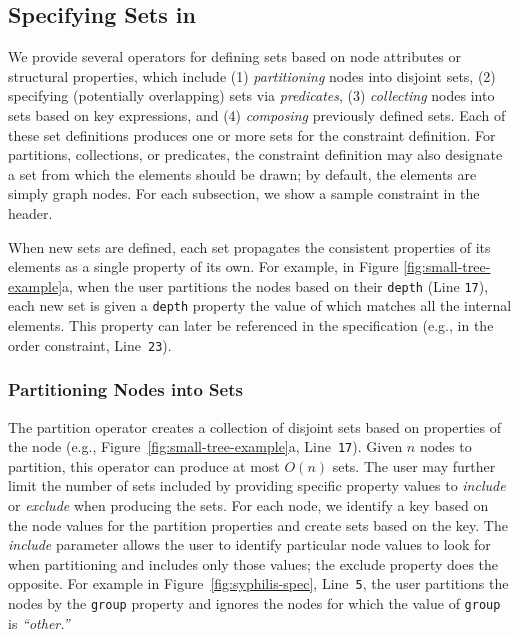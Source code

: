 \smallTreeExampleWebCoLa

\vspace{-10px}
\subsection{Specifying Sets in \projectname}
We provide several operators for defining sets based on node attributes 
or structural properties, which include (1) \emph{partitioning} nodes 
into disjoint sets, (2) specifying (potentially overlapping) sets via
\emph{predicates}, (3) \emph{collecting} nodes into sets based on key expressions,
and (4) \emph{composing} previously defined sets. Each of these set
definitions produces one or more sets for the constraint definition. For
partitions, collections, or predicates, the constraint definition may also 
designate a set from which the elements should be drawn; by default, the
elements are simply graph nodes. For each subsection, we show a sample
\projectname constraint in the header.

When new sets are defined, each set propagates the consistent properties
of its elements as a single property of its own. For example, in
Figure \ref{fig:small-tree-example}a, when the user
partitions the nodes based on their \texttt{depth} (Line
\texttt{17}), each new set is given a \texttt{depth} property the value of which 
matches all the internal elements. This property can later be referenced 
in the \projectname specification (e.g., in the order constraint, Line~\texttt{23}).

\subsubsection{Partitioning Nodes into Sets}
The partition operator creates a collection of disjoint sets based on
properties of the node
(e.g., Figure~\ref{fig:small-tree-example}a, Line~\texttt{17}).
Given $n$ nodes to partition, this operator can produce at most $O(n)$ 
sets. The user may further limit 
the number of sets included by providing specific property values to 
\emph{include} or \emph{exclude} when producing the sets.
For each node, we identify a key based on the node values for the partition
properties and create sets based on the key. The \emph{include} parameter allows
the user to identify particular node values to look for when partitioning
and includes only those values; the exclude property does the opposite. 
For example in Figure~\ref{fig:syphilis-spec}, Line~\texttt{5}, the user
partitions the nodes by the \texttt{group} property and ignores the nodes
for which the value of \texttt{group} is \emph{``other.''}

